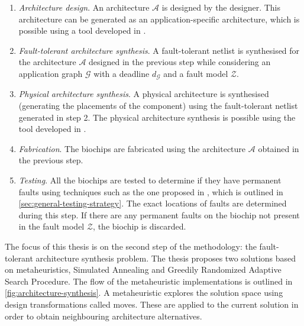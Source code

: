 \begin{enumerate}
\item \emph{Architecture design}. An architecture $\mathcal{A}$ is designed by the designer. This architecture can be generated as an application-specific architecture, which is possible using a tool developed in \cite{wajid}.

\item \emph{Fault-tolerant architecture synthesis}. A fault-tolerant netlist is synthesised for the architecture $\mathcal{A}$ designed in the previous step while considering an application graph $\mathcal{G}$ with a deadline $d_\mathcal{G}$ and a fault model $\mathcal{Z}$.

\item \emph{Physical architecture synthesis}. A physical architecture is synthesised (generating the placements of the component) using the fault-tolerant netlist generated in step 2. The physical architecture synthesis is possible using the tool developed in \cite{michael}.

\item \emph{Fabrication}. The biochips are fabricated using the architecture $\mathcal{A}$ obtained in the previous step.

\item \emph{Testing}. All the biochips are tested to determine if they have permanent faults using techniques such as the one proposed in \cite{fault-modeling}, which is outlined in \autoref{sec:general-testing-strategy}. The exact locations of faults are determined during this step. If there are any permanent faults on the biochip not present in the fault model $\mathcal{Z}$, the biochip is discarded.

\end{enumerate}

The focus of this thesis is on the second step of the methodology: the fault-tolerant architecture synthesis problem. The thesis proposes two solutions based on metaheuristics, Simulated Annealing and Greedily Randomized Adaptive Search Procedure. The flow of the metaheuristic implementations is outlined in \autoref{fig:architecture-synthesis}. A metaheuristic explores the solution space using design transformations called moves. These are applied to the current solution in order to obtain neighbouring architecture alternatives.

